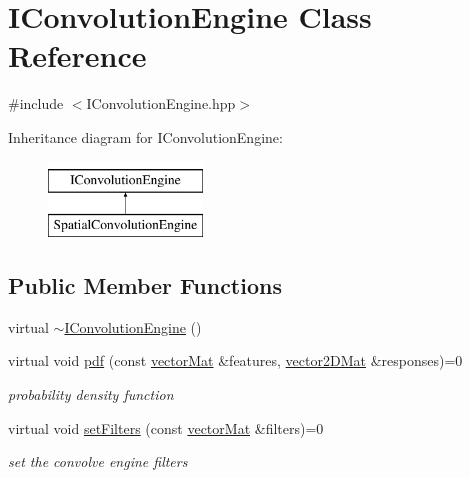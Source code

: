 \hypertarget{classIConvolutionEngine}{\section{I\-Convolution\-Engine Class Reference}
\label{classIConvolutionEngine}
}


{\ttfamily \#include $<$I\-Convolution\-Engine.\-hpp$>$}

Inheritance diagram for I\-Convolution\-Engine\-:\begin{figure}[H]
\begin{center}
\leavevmode
\includegraphics[height=2.000000cm]{classIConvolutionEngine}
\end{center}
\end{figure}
\subsection*{Public Member Functions}
\begin{DoxyCompactItemize}
\item 
virtual \hyperlink{classIConvolutionEngine_a554cb87e8dbd32552defd43549b9c1b3}{$\sim$\-I\-Convolution\-Engine} ()
\item 
virtual void \hyperlink{classIConvolutionEngine_ab5aaabb634629a714d397a6c1a9c9400}{pdf} (const \hyperlink{types_8hpp_a3207a7addcfa415d1c83622febcb1e9b}{vector\-Mat} \&features, \hyperlink{types_8hpp_a33cacb85be7b8df3dc0b67d5d849f4cc}{vector2\-D\-Mat} \&responses)=0
\begin{DoxyCompactList}\small\item\em probability density function \end{DoxyCompactList}\item 
virtual void \hyperlink{classIConvolutionEngine_a3570aae351b5fcb93bcd87a06c65ea0a}{set\-Filters} (const \hyperlink{types_8hpp_a3207a7addcfa415d1c83622febcb1e9b}{vector\-Mat} \&filters)=0
\begin{DoxyCompactList}\small\item\em set the convolve engine filters \end{DoxyCompactList}\end{DoxyCompactItemize}


